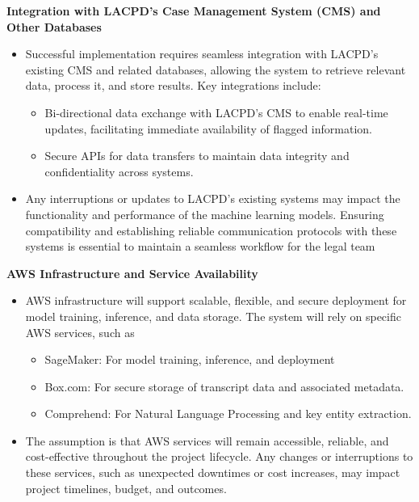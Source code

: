 \documentclass[12pt]{article}
\begin{document}
\textbf{ Integration with LACPD’s Case Management System (CMS) and Other Databases}
\begin{itemize}
  \item  Successful implementation requires seamless integration with LACPD’s existing CMS and
 related databases, allowing the system to retrieve relevant data, process it, and store results.
 Key integrations include:

	\begin{itemize}
		\item    Bi-directional data exchange with LACPD’s CMS to enable real-time updates, facilitating immediate availability of flagged information.
		\item   Secure APIs for data transfers to maintain data integrity and confidentiality across systems.

	\end{itemize}
  \item Any interruptions or updates to LACPD’s existing systems may impact the functionality and
 performance of the machine learning models. Ensuring compatibility and establishing
 reliable communication protocols with these systems is essential to maintain a seamless
 workflow for the legal team
\end{itemize}

\textbf{  AWS Infrastructure and Service Availability}
\begin{itemize}
  \item  AWS infrastructure will support scalable, flexible, and secure deployment for model training,
 inference, and data storage. The system will rely on specific AWS services, such as
	\begin{itemize}
		\item    SageMaker: For model training, inference, and deployment
		\item  Box.com: For secure storage of transcript data and associated metadata.
		\item  Comprehend: For Natural Language Processing and key entity extraction.
	\end{itemize}
  \item The assumption is that AWS services will remain accessible, reliable, and cost-effective
 throughout the project lifecycle. Any changes or interruptions to these services, such as
 unexpected downtimes or cost increases, may impact project timelines, budget, and
 outcomes.
\end{itemize}
\end{document}
